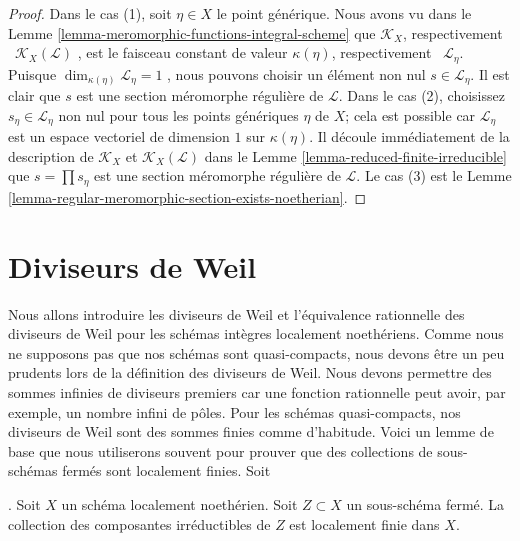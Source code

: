 \begin{proof}
Dans le cas (1), soit  $\eta \in X$  le point générique. Nous avons vu dans le Lemme
 \ref{lemma-meromorphic-functions-integral-scheme}  que  $\mathcal{K}_X$, respectivement \ $\mathcal{K}_X(\mathcal{L})$ , est le
faisceau constant de valeur  $\kappa(\eta)$, respectivement \ $\mathcal{L}_\eta$.
Puisque  $\dim_{\kappa(\eta)} \mathcal{L}_\eta = 1$ , nous pouvons choisir un élément non nul  $s \in \mathcal{L}_\eta$. Il est
clair que  $s$  est une section méromorphe régulière de  $\mathcal{L}$. Dans
le cas (2), choisissez  $s_\eta \in \mathcal{L}_\eta$  non nul pour tous les points génériques
 $\eta$  de  $X$; cela est possible car  $\mathcal{L}_\eta$  est un espace
vectoriel de dimension  $1$ sur  $\kappa(\eta)$. Il découle immédiatement de
la description de  $\mathcal{K}_X$  et  $\mathcal{K}_X(\mathcal{L})$  dans le Lemme  \ref{lemma-reduced-finite-irreducible}  que
 $s = \prod s_\eta$  est une section méromorphe régulière de  $\mathcal{L}$. Le cas (3) est
le Lemme  \ref{lemma-regular-meromorphic-section-exists-noetherian}.
\end{proof}






\section{Diviseurs de Weil}
\label{section-Weil-divisors}

\noindent
Nous allons introduire les diviseurs de Weil et l'équivalence rationnelle des
diviseurs de Weil pour les schémas intègres localement noethériens. Comme nous ne
supposons pas que nos schémas sont quasi-compacts, nous devons être un peu
prudents lors de la définition des diviseurs de Weil. Nous devons permettre des
sommes infinies de diviseurs premiers car une fonction rationnelle peut avoir, par
exemple, un nombre infini de pôles. Pour les schémas quasi-compacts, nos diviseurs
de Weil sont des sommes finies comme d'habitude. Voici un lemme de base que nous
utiliserons souvent pour prouver que des collections de sous-schémas fermés sont
localement finies. Soit

\begin{lemma}
\label{lemma-components-locally-finite}
. Soit  $X$  un schéma localement noethérien. Soit  $Z \subset X$  un
sous-schéma fermé. La collection des composantes irréductibles de  $Z$  est
localement finie dans  $X$.
\end{lemma}

